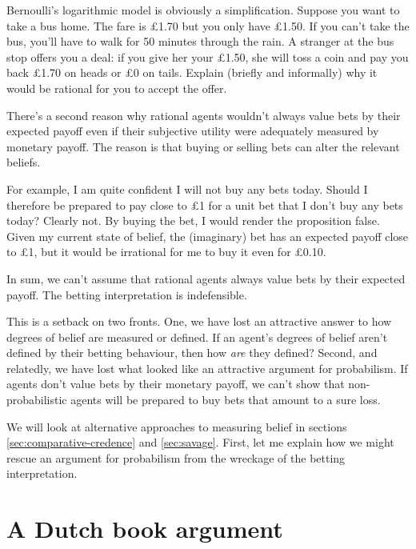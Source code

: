 \begin{exercise}{1}
  Bernoulli's logarithmic model is obviously a simplification. Suppose you want
  to take a bus home. The fare is £1.70 but you only have £1.50. If you can't
  take the bus, you'll have to walk for 50 minutes through the rain. A stranger
  at the bus stop offers you a deal: if you give her your £1.50, she will toss a
  coin and pay you back £1.70 on heads or £0 on tails. Explain (briefly and
  informally) why it would be rational for you to accept the offer.
\end{exercise}

There's a second reason why rational agents wouldn't always value bets by their
expected payoff even if their subjective utility were adequately measured by
monetary payoff. The reason is that buying or selling bets can alter the
relevant beliefs.

For example, I am quite confident I will not buy any bets today. Should I
therefore be prepared to pay close to £1 for a unit bet that I don't buy any
bets today? Clearly not. By buying the bet, I would render the proposition
false. Given my current state of belief, the (imaginary) bet has an expected
payoff close to £1, but it would be irrational for me to buy it even for £0.10.

In sum, we can't assume that rational agents always value bets by their expected
payoff. The betting interpretation is indefensible.

This is a setback on two fronts. One, we have lost an attractive answer to how
degrees of belief are measured or defined. If an agent's degrees of belief
aren't defined by their betting behaviour, then how \emph{are} they defined?
Second, and relatedly, we have lost what looked like an attractive argument for
probabilism. If agents don't value bets by their monetary payoff, we can't show
that non-probabilistic agents will be prepared to buy bets that amount to a sure
loss.

We will look at alternative approaches to measuring belief in sections
\ref{sec:comparative-credence} and \ref{sec:savage}. First, let me explain how
we might rescue an argument for probabilism from the wreckage of the
betting interpretation.

\section{A Dutch book argument}\label{sec:my-dba}

